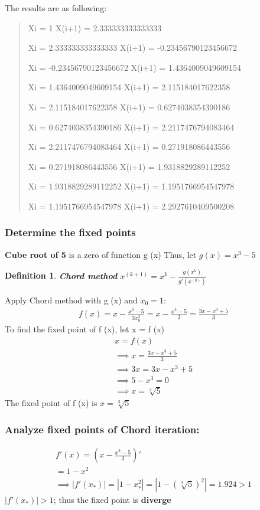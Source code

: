 The results are as following:
\begin{quote}
Xi =  1
X(i+1) =  2.333333333333333 

Xi =  2.333333333333333
X(i+1) =  -0.23456790123456672 

Xi =  -0.23456790123456672
X(i+1) =  1.4364009049609154 

Xi =  1.4364009049609154
X(i+1) =  2.115184017622358 

Xi =  2.115184017622358
X(i+1) =  0.6274038354390186 

Xi =  0.6274038354390186
X(i+1) =  2.2117476794083464 

Xi =  2.2117476794083464
X(i+1) =  0.271918086443556 

Xi =  0.271918086443556
X(i+1) =  1.9318829289112252 

Xi =  1.9318829289112252
X(i+1) =  1.1951766954547978 

Xi =  1.1951766954547978
X(i+1) =  2.2927610409500208 
\end{quote}

\subsubsection{Determine the fixed points}
\textbf{Cube root of 5} is a zero of function g (x)
Thus, let $g(x) = x^{3} - 5$

\newtheorem{mydef}{Definition}
\begin{mydef}
\textbf{Chord method}
$x^{(k+1)} = x^{k} - \frac{g(x^{k})}{g'(x^{(0)})}$
\end{mydef}

Apply Chord method with g (x) and $x_0 = 1$:
\begin{align*}
    f(x) = x - \frac{x^{3} - 5}{3x_{0}^{2}}
    = x - \frac{x^{3} - 5}{3}
    = \frac{3x - x^{3} + 5}{3}
\end{align*}
To find the fixed point of f (x), let x = f (x)
\begin{align*}
    x = f(x) \\
    \implies x = \frac{3x - x^{3} + 5}{3} \\
    \implies 3x = 3x - x^{3} + 5 \\
    \implies 5 - x^{3} = 0 \\
    \implies x = \sqrt[3]{5}
\end{align*}
The fixed point of f (x) is $x = \sqrt[3]{5}$

\subsubsection{Analyze fixed points of Chord iteration:}
\begin{align*}
    f'(x) = (x - \frac{x^{3} - 5}{3})'\\
    = 1 - x^{2}\\
    \implies |f'(x_{*})| = |1 - x_{*}^{2}| = |1 - (\sqrt[3]{5})^{2}| = 1.924 > 1
\end{align*}
$|f'(x_{*})| > 1$; thus the fixed point is \textbf{diverge} 


